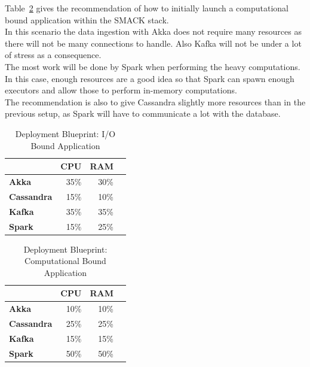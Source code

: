 Table~\ref{tab:blueprint-computational} gives the recommendation of how to initially launch a computational bound application within the SMACK stack.\\
In this scenario the data ingestion with Akka does not require many resources as there will not be many connections to handle.
Also Kafka will not be under a lot of stress as a consequence.\\
The most work will be done by Spark when performing the heavy computations.
In this case, enough resources are a good idea so that Spark can spawn enough executors and allow those to perform in-memory computations.\\
The recommendation is also to give Cassandra slightly more resources than in the previous setup, as Spark will have to communicate a lot with the database.

\begin{table}[]
\begin{tabular}{lrrr}
\toprule
                   & \textbf{CPU} & \textbf{RAM} \\ \midrule
\textbf{Akka}      & 35\%         & 30\%  \\
\textbf{Cassandra} & 15\%         & 10\%  \\
\textbf{Kafka}     & 35\%         & 35\%  \\
\textbf{Spark}     & 15\%         & 25\%  \\
\bottomrule
\end{tabular}
\centering
\caption{Deployment Blueprint: I/O Bound Application}
\label{tab:blueprint-io}
\end{table}


\begin{table}[]
\begin{tabular}{lrrr}
\toprule
                   & \textbf{CPU} & \textbf{RAM} \\ \midrule
\textbf{Akka}      & 10\%         & 10\%  \\
\textbf{Cassandra} & 25\%         & 25\%  \\
\textbf{Kafka}     & 15\%         & 15\%  \\
\textbf{Spark}     & 50\%         & 50\%  \\
\bottomrule
\end{tabular}
\centering
\caption{Deployment Blueprint: Computational Bound Application}
\label{tab:blueprint-computational}
\end{table}

